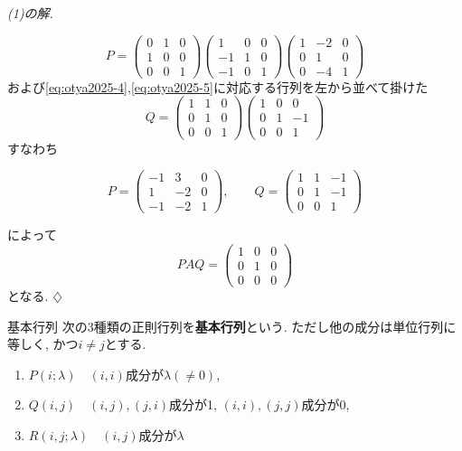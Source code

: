 \documentclass[titlepage]{jsarticle}
\numberwithin{equation}{section}
\newenvironment{kaitou}[1][解]{%
\begin{proofbox}%
\textit{#1. }\ignorespaces
}{%
\hfill$\diamondsuit$%
\end{proofbox}%
}
\begin{document}
\begin{kaitou}[(1)の解]
\[
P = 
\begin{pmatrix}
0 & 1 & 0\\
1 & 0 & 0\\
0 & 0 & 1
\end{pmatrix}
\begin{pmatrix}
1 & 0 & 0\\
-1 & 1 & 0\\
-1 & 0 & 1
\end{pmatrix}
\begin{pmatrix}
1 & -2 & 0\\
0 & 1 & 0\\
0 & -4 & 1
\end{pmatrix}
\]
および\eqref{eq:otya2025-4},\eqref{eq:otya2025-5}に対応する行列を左から並べて掛けた
\[
Q = 
\begin{pmatrix}
1 & 1 & 0\\
0 & 1 & 0\\
0 & 0 & 1
\end{pmatrix}
\begin{pmatrix}
1 & 0 & 0\\
0 & 1 & -1\\
0 & 0 & 1
\end{pmatrix}
\]
すなわち
\begin{answerbox}
\[
P = 
\begin{pmatrix}
-1 & 3 & 0\\
1 & -2 & 0\\
-1 & -2 & 1
\end{pmatrix}, \qquad
Q = 
\begin{pmatrix}
1 & 1 & -1\\
0 & 1 & -1\\
0 & 0 & 1
\end{pmatrix}
\]
\end{answerbox}
によって
\[
PAQ = 
\begin{pmatrix}
1 & 0 & 0\\
0 & 1 & 0\\
0 & 0& 0
\end{pmatrix}
\]
となる.
\end{kaitou}
\begin{dfn}{基本行列}{}
次の3種類の正則行列を\textbf{基本行列}という. ただし他の成分は単位行列に等しく, かつ$i \ne j$とする. 
\begin{enumerate}[label=(\arabic*)]
\item $P(i; \lambda)\quad(i, i)$成分が$\lambda (\ne 0)$,
\item $Q(i, j)\quad (i, j), (j, i)$成分が1, $(i, i), (j, j)$成分が0,
\item $R(i, j;\lambda) \quad(i, j)$成分が$\lambda$
\end{enumerate}
\end{dfn}
\end{document}
